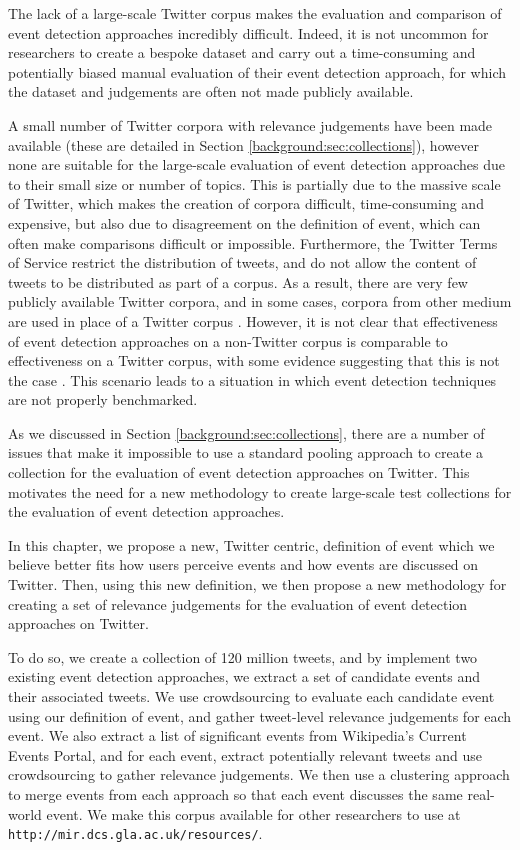 The lack of a large-scale Twitter corpus makes the evaluation and comparison of event detection approaches incredibly difficult.
Indeed, it is not uncommon for researchers to create a bespoke dataset and carry out a time-consuming and potentially biased manual evaluation of their event detection approach, for which the dataset and judgements are often not made publicly available.

A small number of Twitter corpora with relevance judgements have been made available (these are detailed in Section \ref{background:sec:collections}), however none are suitable for the large-scale evaluation of event detection approaches due to their small size or number of topics.
This is partially due to the massive scale of Twitter, which makes the creation of corpora difficult, time-consuming and expensive, but also due to disagreement on the definition of event, which can often make comparisons difficult or impossible.
Furthermore, the Twitter Terms of Service restrict the distribution of tweets, and do not allow the content of tweets to be distributed as part of a corpus.
As a result, there are very few publicly available Twitter corpora, and in some cases, corpora from other medium are used in place of a Twitter corpus \citep{Aggarwal12,Petrovic:2010:SFS:1857999.1858020,Petrovic:2012:UPI:2382029.2382072}.
However, it is not clear that effectiveness of event detection approaches on a non-Twitter corpus is comparable to effectiveness on a Twitter corpus, with some evidence suggesting that this is not the case \citep{Petrovic:2012:UPI:2382029.2382072}.
This scenario leads to a situation in which event detection techniques are not properly benchmarked.

As we discussed in Section \ref{background:sec:collections}, there are a number of issues that make it impossible to use a standard pooling approach to create a collection for the evaluation of event detection approaches on Twitter.
This motivates the need for a new methodology to create large-scale test collections for the evaluation of event detection approaches.

In this chapter, we propose a new, Twitter centric, definition of event which we believe better fits how users perceive events and how events are discussed on Twitter.
Then, using this new definition, we then propose a new methodology for creating a set of relevance judgements for the evaluation of event detection approaches on Twitter.

To do so, we create a collection of 120 million tweets, and by implement two existing event detection approaches, we extract a set of candidate events and their associated tweets.
We use crowdsourcing to evaluate each candidate event using our definition of event, and gather tweet-level relevance judgements for each event.
We also extract a list of significant events from Wikipedia's Current Events Portal, and for each event, extract potentially relevant tweets and use crowdsourcing to gather relevance judgements.
We then use a clustering approach to merge events from each approach so that each event discusses the same real-world event.
We make this corpus available for other researchers to use at \texttt{http://mir.dcs.gla.ac.uk/resources/}.

